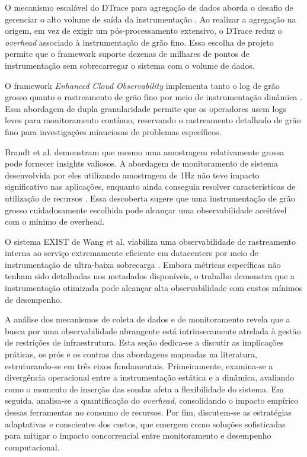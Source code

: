 \documentclass[sigconf, anonymous]{acmart}
\begin{document}
O mecanismo escalável do DTrace para agregação de dados aborda o desafio de gerenciar o alto volume de saída da instrumentação \cite{cantrill_2004}. Ao realizar a agregação na origem, em vez de exigir um pós-processamento extensivo, o DTrace reduz o \textit{overhead} associado à instrumentação de grão fino. Essa escolha de projeto permite que o framework suporte dezenas de milhares de pontos de instrumentação sem sobrecarregar o sistema com o volume de dados.

O framework \textit{Enhanced Cloud Observability} implementa tanto o log de grão grosso quanto o rastreamento de grão fino por meio de instrumentação dinâmica \cite{ramesh_2025}. Essa abordagem de dupla granularidade permite que os operadores usem logs leves para monitoramento contínuo, reservando o rastreamento detalhado de grão fino para investigações minuciosas de problemas específicos.

Brandt et al. demonstram que mesmo uma amostragem relativamente grossa pode fornecer insights valiosos. A abordagem de monitoramento de sistema desenvolvida por eles utilizando amostragem de 1Hz não teve impacto significativo nas aplicações, enquanto ainda conseguia resolver características de utilização de recursos \cite{brandt_2018}. Essa descoberta sugere que uma instrumentação de grão grosso cuidadosamente escolhida pode alcançar uma observabilidade aceitável com o mínimo de overhead.

O sistema EXIST de Wang et al. viabiliza uma observabilidade de rastreamento interna ao serviço extremamente eficiente em datacenters por meio de instrumentação de ultra-baixa sobrecarga \cite{wang_hou_2025}. Embora métricas específicas não tenham sido detalhadas nos metadados disponíveis, o trabalho demonstra que a instrumentação otimizada pode alcançar alta observabilidade com custos mínimos de desempenho.

A análise dos mecanismos de coleta de dados e de monitoramento revela que a busca por uma observabilidade abrangente está intrinsecamente atrelada à gestão de restrições de infraestrutura. Esta seção dedica-se a discutir as implicações práticas, os prós e os contras das abordagens mapeadas na literatura, estruturando-se em três eixos fundamentais. Primeiramente, examina-se a divergência operacional entre a instrumentação estática e a dinâmica, avaliando como o momento de inserção das sondas afeta a flexibilidade do sistema. Em seguida, analisa-se a quantificação do \textit{overhead}, consolidando o impacto empírico dessas ferramentas no consumo de recursos. Por fim, discutem-se as estratégias adaptativas e conscientes dos custos, que emergem como soluções sofisticadas para mitigar o impacto concorrencial entre monitoramento e desempenho computacional.
\end{document}
